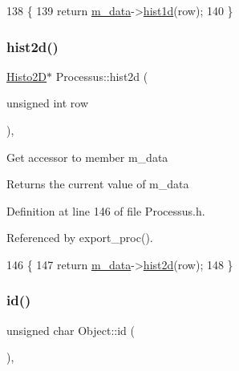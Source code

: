 \begin{DoxyCode}
138                                    \{
139     \textcolor{keywordflow}{return} \hyperlink{classProcessus_a3da9a9de8af54e2f47807a3e09dfccff}{m\_data}->\hyperlink{classData_a476a66728ccfc553909d15b36c22492a}{hist1d}(row);
140   \}
\end{DoxyCode}
\mbox{\label{classProcessus_a73b5118cb5f2b5eaad33286183b86cfc}} 
\subsubsection{\texorpdfstring{hist2d()}{hist2d()}}
{\footnotesize\ttfamily \hyperlink{classHisto2D}{Histo2D}$\ast$ Processus\+::hist2d (\begin{DoxyParamCaption}\item[{unsigned int}]{row }\end{DoxyParamCaption})\hspace{0.3cm}{\ttfamily [inline]}, {\ttfamily [inherited]}}

Get accessor to member m\+\_\+data \begin{DoxyReturn}{Returns}
the current value of m\+\_\+data 
\end{DoxyReturn}


Definition at line 146 of file Processus.\+h.



Referenced by export\+\_\+proc().


\begin{DoxyCode}
146                                    \{
147     \textcolor{keywordflow}{return} \hyperlink{classProcessus_a3da9a9de8af54e2f47807a3e09dfccff}{m\_data}->\hyperlink{classData_ab717ebe242192605ad509b76df35e855}{hist2d}(row);
148   \}
\end{DoxyCode}
\mbox{\label{classObject_af99145335cc61ff6e2798ea17db009d2}} 
\subsubsection{\texorpdfstring{id()}{id()}}
{\footnotesize\ttfamily unsigned char Object\+::id (\begin{DoxyParamCaption}{ }\end{DoxyParamCaption})\hspace{0.3cm}{\ttfamily [inline]}, {\ttfamily [inherited]}}



